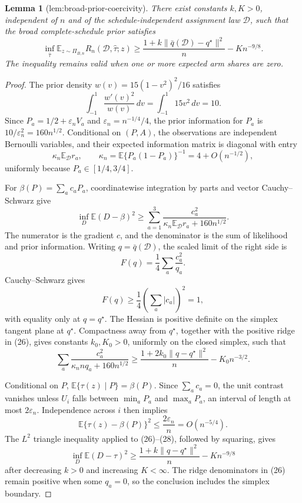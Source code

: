 \documentclass{article}
\newtheorem{lemma}{Lemma}
\begin{document}
\begin{lemma}[lem:broad-prior-coercivity]\label{lem:broad-prior-coercivity}
There exist constants \(k,K>0\), independent of \(n\) and of the schedule-independent assignment law \(\mathcal D\), such that the broad complete-schedule prior satisfies
\[
\inf_{\widehat\tau}
\mathbb E_{z\sim\Pi_{B,n}}R_n(\mathcal D,\widehat\tau;z)
\geq \frac{1+k\|\bar q(\mathcal D)-q^\star\|^2}{n}
-K n^{-9/8}.
\]
The inequality remains valid when one or more expected arm shares are zero.
\end{lemma}
\begin{proof}
The prior density \(w(v)=15(1-v^2)^2/16\) satisfies
\[
\int_{-1}^1\frac{w'(v)^2}{w(v)}\,dv
=\int_{-1}^1 15v^2\,dv=10.
\]
Since \(P_a=1/2+\varepsilon_nV_a\) and \(\varepsilon_n=n^{-1/4}/4\), the prior information for \(P_a\) is \(10/\varepsilon_n^2=160n^{1/2}\).  Conditional on \((P,A)\), the observations are independent Bernoulli variables, and their expected information matrix is diagonal with entry
\[
\kappa_n\mathbb E_{\mathcal D}r_a,
\qquad
\kappa_n=\mathbb E\{P_a(1-P_a)\}^{-1}=4+O(n^{-1/2}),
\]
uniformly because \(P_a\in[1/4,3/4]\).

For \(\beta(P)=\sum_ac_aP_a\), coordinatewise integration by parts and vector Cauchy--Schwarz give
\[
\inf_D\mathbb E(D-\beta)^2
\geq\sum_{a=1}^3
\frac{c_a^2}{\kappa_n\mathbb E_{\mathcal D}r_a+160n^{1/2}}.
\tag{26}
\]
The numerator is the gradient \(c\), and the denominator is the sum of likelihood and prior information.  Writing \(q=\bar q(\mathcal D)\), the scaled limit of the right side is
\[
F(q)=\frac14\sum_a\frac{c_a^2}{q_a}.
\]
Cauchy--Schwarz gives
\[
F(q)\geq\frac14\left(\sum_a|c_a|\right)^2=1,
\]
with equality only at \(q=q^\star\).  The Hessian is positive definite on the simplex tangent plane at \(q^\star\).  Compactness away from \(q^\star\), together with the positive ridge in (26), gives constants \(k_0,K_0>0\), uniformly on the closed simplex, such that
\[
\sum_a\frac{c_a^2}{\kappa_n n q_a+160n^{1/2}}
\geq\frac{1+2k_0\|q-q^\star\|^2}{n}-K_0n^{-3/2}.
\tag{27}
\]

Conditional on \(P\), \(\mathbb E\{\tau(z)\mid P\}=\beta(P)\).  Since \(\sum_ac_a=0\), the unit contrast vanishes unless \(U_i\) falls between \(\min_aP_a\) and \(\max_aP_a\), an interval of length at most \(2\varepsilon_n\).  Independence across \(i\) then implies
\[
\mathbb E\{\tau(z)-\beta(P)\}^2
\leq\frac{2\varepsilon_n}{n}=O(n^{-5/4}).
\tag{28}
\]
The \(L^2\) triangle inequality applied to (26)--(28), followed by squaring, gives
\[
\inf_D\mathbb E(D-\tau)^2
\geq\frac{1+k\|q-q^\star\|^2}{n}-Kn^{-9/8}
\]
after decreasing \(k>0\) and increasing \(K<\infty\).  The ridge denominators in (26) remain positive when some \(q_a=0\), so the conclusion includes the simplex boundary.
\end{proof}
\end{document}
